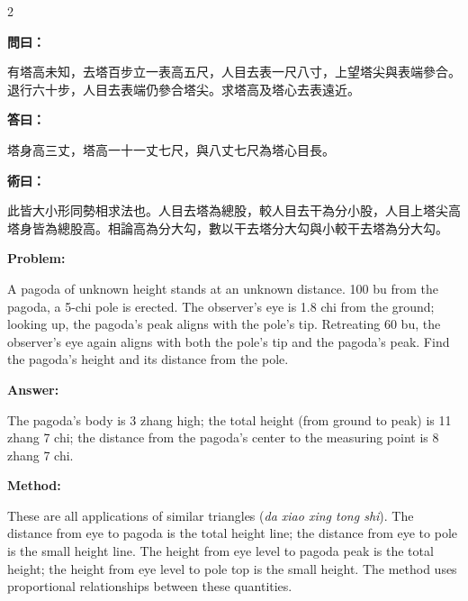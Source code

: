 \documentclass[11pt,a4paper]{article}
\newcommand{\wen}{\textbf{\color{sectioncolor}問}}
\newcommand{\da}{\textbf{\color{answercolor}答}}
\newcommand{\shu}{\textbf{\color{methodcolor}術}}
\newcommand{\prob}{\textbf{\color{sectioncolor}Problem}}
\newcommand{\ans}{\textbf{\color{answercolor}Answer}}
\newcommand{\meth}{\textbf{\color{methodcolor}Method}}
\newenvironment{zhanswer}{%
  \medskip\noindent{\color{answercolor}\rule{0.9\columnwidth}{0.4pt}}%
  \par\color{answercolor}\small
}{\par\medskip}
\newenvironment{enanswer}{%
  \medskip\noindent{\color{answercolor}\rule{0.9\columnwidth}{0.4pt}}%
  \par\color{answercolor}\small
}{\par\medskip}
\newenvironment{zhmethod}{%
  \medskip\noindent{\color{methodcolor}\rule{0.9\columnwidth}{0.4pt}}%
  \par\color{methodcolor}\small
}{\par\medskip}
\newenvironment{enmethod}{%
  \medskip\noindent{\color{methodcolor}\rule{0.9\columnwidth}{0.4pt}}%
  \par\color{methodcolor}\small
}{\par\medskip}
\begin{document}
\begin{paracol}{2}

\switchcolumn[0]
\noindent\wen\textbf{曰：}

有塔高未知，去塔百步立一表高五尺，人目去表一尺八寸，上望塔尖與表端參合。退行六十步，人目去表端仍參合塔尖。求塔高及塔心去表遠近。

\begin{zhanswer}
\noindent\da\textbf{曰：}

塔身高三丈，塔高一十一丈七尺，與八丈七尺為塔心目長。
\end{zhanswer}

\begin{zhmethod}
\noindent\shu\textbf{曰：}

此皆大小形同勢相求法也。人目去塔為總股，較人目去干為分小股，人目上塔尖高塔身皆為總股高。相論高為分大勾，數以干去塔分大勾與小較干去塔為分大勾。
\end{zhmethod}

\switchcolumn[1]
\noindent\prob\textbf{:}

A pagoda of unknown height stands at an unknown distance. 100 bu from the pagoda, a 5-chi pole is erected. The observer's eye is 1.8 chi from the ground; looking up, the pagoda's peak aligns with the pole's tip. Retreating 60 bu, the observer's eye again aligns with both the pole's tip and the pagoda's peak. Find the pagoda's height and its distance from the pole.
\begin{enanswer}
\noindent\ans\textbf{:}

The pagoda's body is 3 zhang high; the total height (from ground to peak) is 11 zhang 7 chi; the distance from the pagoda's center to the measuring point is 8 zhang 7 chi.
\end{enanswer}

\begin{enmethod}
\noindent\meth\textbf{:}

These are all applications of similar triangles (\textit{da xiao xing tong shi}). The distance from eye to pagoda is the total height line; the distance from eye to pole is the small height line. The height from eye level to pagoda peak is the total height; the height from eye level to pole top is the small height. The method uses proportional relationships between these quantities.
\end{enmethod}

\end{paracol}

\vspace{0.5em}
\end{document}

